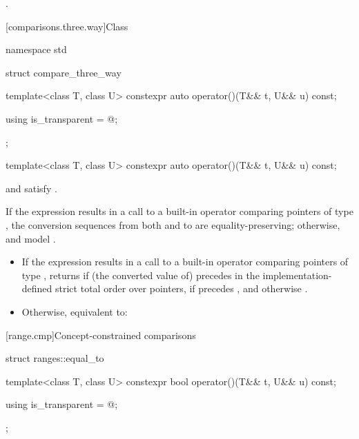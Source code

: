 \begin{itemdescr}
\pnum
\returns
{}.
\end{itemdescr}

[comparisons.three.way]{Class }

%
\begin{codeblock}
namespace std {
  struct compare_three_way {
    template<class T, class U>
      constexpr auto operator()(T&& t, U&& u) const;

    using is_transparent = @\unspec@;
  };
}
\end{codeblock}

\begin{itemdecl}
template<class T, class U>
  constexpr auto operator()(T&& t, U&& u) const;
\end{itemdecl}

\begin{itemdescr}
\pnum
\constraints
{} and  satisfy .

\pnum
\expects
If the expression  results in
a call to a built-in operator \tcode{<=>} comparing pointers of type ,
the conversion sequences from both  and  to 
are equality-preserving;
otherwise,  and  model .

\pnum
\effects
\begin{itemize}
\item
  If the expression  results in
  a call to a built-in operator \tcode{<=>} comparing pointers of type ,
  returns 
  if (the converted value of)  precedes 
  in the implementation-defined strict total order
  over pointers,
  if  precedes , and
  otherwise .
\item
  Otherwise, equivalent to: 
\end{itemize}
\end{itemdescr}

[range.cmp]{Concept-constrained comparisons}

%
\begin{codeblock}
struct ranges::equal_to {
  template<class T, class U>
    constexpr bool operator()(T&& t, U&& u) const;

  using is_transparent = @\unspecnc@;
};
\end{codeblock}

